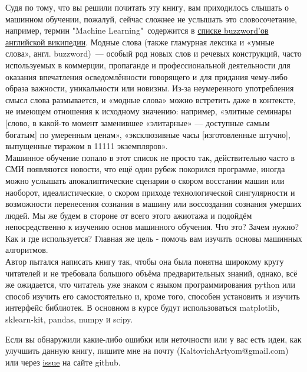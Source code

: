 Судя по тому, что вы решили почитать эту книгу, вам приходилось слышать о машинном обучении, пожалуй, сейчас сложнее не услышать это словосочетание, например, термин "Machine Learning"\ содержится в \href{https://en.wikipedia.org/wiki/List_of_buzzwords}{списке buzzword'ов английской википедии}.
Модные слова (также гламурная лексика и «умные слова», англ. buzzword)~— особый род новых слов и речевых конструкций, часто используемых в коммерции, пропаганде и профессиональной деятельности для оказания впечатления осведомлённости говорящего и для придания чему-либо образа важности, уникальности или новизны. Из-за неумеренного употребления смысл слова размывается, и «модные слова» можно встретить даже в контексте, не имеющем отношения к исходному значению: например, «элитные семинары [слово, в какой-то момент заменившее «элитарные» — доступные самым богатым] по умеренным ценам», «эксклюзивные часы [изготовленные штучно], выпущенные тиражом в 11111 экземпляров». \cite{wiki:buzzword_def}\\

Машинное обучение попало в этот список не просто так, действительно часто в СМИ появляются новости, что ещё один рубеж покорился программе, иногда можно услышать апокалиптические сценарии о скором восстании машин или наоборот, идеалистические, о скором приходе технологической сингулярности и возможности перенесения сознания в машину или воссоздания сознания умерших людей. Мы же будем в стороне от всего этого ажиотажа и подойдём непосредственно к изучению основ машинного обучения. Что это? Зачем нужно? Как и где используется? Главная же цель \-- помочь вам изучить основы машинных алгоритмов.\\

Автор пытался написать книгу так, чтобы она была понятна широкому кругу читателей и не требовала большого объёма предварительных знаний, однако, всё же ожидается, что читатель уже знаком с языком программирования python или способ изучить его самостоятельно и, кроме того, способен установить и изучить интерфейс библиотек. В основном в курсе будут использоваться matplotlib, sklearn-kit, pandas, numpy и scipy.

Если вы обнаружили какие-либо ошибки или неточности или у вас есть идеи, как улучшить данную книгу, пишите мне на почту (KaltovichArtyom@gmail.com) или через \href{https://github.com/ArtyomKaltovich/ml-cource/issues}{issue} на сайте github.


